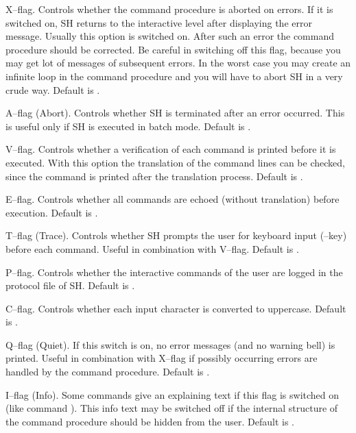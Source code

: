 \begin{deflist}{}
\item[\exm{cmderrstop}]  X--flag.
   Controls whether the command procedure is aborted on errors.
   If it is switched on, SH returns to the interactive level
   after displaying the error message.  Usually this option is
   switched on.  After such an error the command procedure should
   be corrected.  Be careful in switching off this flag, because
   you may get lot of messages of subsequent errors.  In the worst
   case you may create an infinite loop in the command procedure
   and you will have to abort SH in a very crude way.
   Default is .
\item[\exm{sherrstop}]  A--flag (Abort).
   Controls whether SH is terminated after an error occurred.  This
   is useful only if SH is executed in batch mode. Default is
   .
\item[\exm{verify}]  V--flag.
   Controls whether a verification of each command is printed before
   it is executed.  With this option the translation of the command
   lines can be checked, since the command is printed after
   the translation process.  Default is .
\item[\exm{echo}]  E--flag.
   Controls whether all commands are echoed (without translation)
   before execution.  Default is .
\item[\exm{step}]  T--flag (Trace).
   Controls whether SH prompts the user for keyboard input
   (--key) before each command.  Useful in
   combination with V--flag.  Default is .
\item[\exm{protocol}]  P--flag.
   Controls whether the interactive commands of the user are logged
   in the protocol file of SH.  Default is .
\item[\exm{capcnv}]  C--flag.
   Controls whether each input character is converted to uppercase.
   Default is .
\item[\exm{noerrmsg}]  Q--flag (Quiet).
   If this switch is on, no error messages (and no warning bell)
   is printed.  Useful in combination with X--flag if possibly
   occurring errors are handled by the command procedure.
   Default is .
\item[\exm{chatty}]  I--flag (Info).
   Some commands give an explaining text if this flag is switched
   on (like command ).  This info text may be switched off
   if the internal structure of the command procedure should be
   hidden from the user.  Default is .
\end{deflist}

